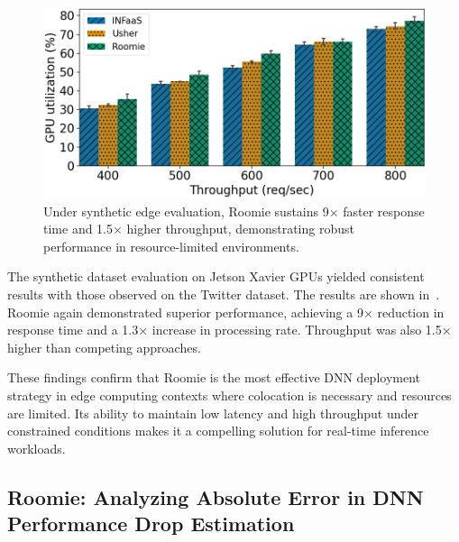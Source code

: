 \begin{figure}
\begin{minipage}[t]{.24\textwidth}
	\end{minipage}
	\hfill
	\begin{minipage}[t]{.24\textwidth}
		\centering
		\includegraphics[width=\textwidth]{chapters/roomie/images/JetsonNano/synthetic-all-models/gpu_utilization.png}
	\end{minipage}
	\caption{Under synthetic edge evaluation, Roomie sustains 9× faster response time and 1.5× higher throughput, demonstrating robust performance in resource-limited environments.}
	\label{fig:JetsonNano/synthetic-all-models}
	\vspace{-3mm}
\end{figure}

The synthetic dataset evaluation on Jetson Xavier GPUs yielded consistent results with those observed on the Twitter dataset. The results are shown in~. Roomie again demonstrated superior performance, achieving a 9× reduction in response time and a 1.3× increase in processing rate. Throughput was also 1.5× higher than competing approaches.

These findings confirm that Roomie is the most effective DNN deployment strategy in edge computing contexts where colocation is necessary and resources are limited. Its ability to maintain low latency and high throughput under constrained conditions makes it a compelling solution for real-time inference workloads.


\subsection{Roomie: Analyzing Absolute Error in DNN Performance Drop Estimation}

